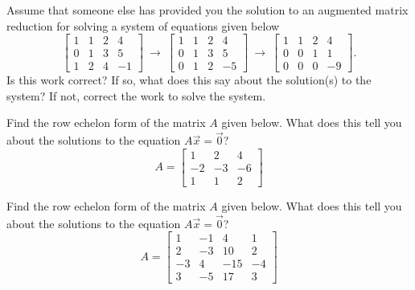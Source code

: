 \documentclass{ximera}
\begin{document}
\begin{exercise}%
    Assume that someone else has provided you the solution to an augmented matrix reduction for solving a system of equations given below
    \begin{equation*}
        \begin{bmatrix}
            1 & 1 & 2 & 4 \\
            0 & 1 & 3 & 5 \\
            1 & 2 & 4 & -1
        \end{bmatrix} \ \rightarrow \ \begin{bmatrix} 1 & 1 & 2 & 4 \\ 0 & 1 & 3 & 5 \\ 0 & 1 & 2 & -5 \end{bmatrix} \ \rightarrow \ \begin{bmatrix} 1 & 1 & 2 & 4 \\ 0 & 0 & 1 & 1 \\ 0 & 0 & 0 & -9 \end{bmatrix}.
    \end{equation*} 
    Is this work correct? If so, what does this say about the solution(s) to the system? If not, correct the work to solve the system.
\end{exercise}

\begin{exercise}
    Find the row echelon form of the matrix $A$ given below. What does this tell you about the solutions to the equation $A\vec{x} = \vec{0}$?
    \begin{equation*}
        A = \begin{bmatrix} 1 & 2 & 4 \\ -2 & -3 & -6 \\ 1 & 1 & 2 \end{bmatrix}
    \end{equation*}
\end{exercise}


\begin{exercise}
    Find the row echelon form of the matrix $A$ given below. What does this tell you about the solutions to the equation $A\vec{x} = \vec{0}$?
    \begin{equation*}
        A = \begin{bmatrix} 1 & -1 & 4 & 1 \\ 2 & -3 & 10 & 2 \\ -3 & 4 & -15 & -4 \\ 3 & -5 & 17 & 3 \end{bmatrix}
    \end{equation*}
\end{exercise}
%
%
\end{document}
